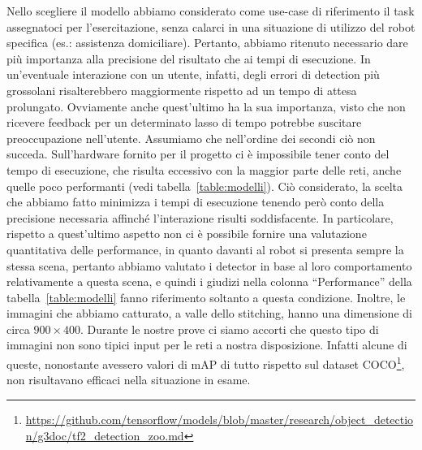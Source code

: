 Nello scegliere il modello abbiamo considerato come use-case di riferimento il task assegnatoci per l'esercitazione, senza calarci in una situazione di utilizzo del robot specifica (es.\@: assistenza domiciliare). Pertanto, abbiamo ritenuto necessario dare più importanza alla precisione del risultato che ai tempi di esecuzione. In un'eventuale interazione con un utente, infatti, degli errori di detection più grossolani risalterebbero maggiormente rispetto ad un tempo di attesa prolungato. Ovviamente anche quest'ultimo ha la sua importanza, visto che non ricevere feedback per un determinato lasso di tempo potrebbe suscitare preoccupazione nell'utente. Assumiamo che nell'ordine dei secondi ciò non succeda. 
Sull'hardware fornito per il progetto ci è impossibile tener conto del tempo di esecuzione, che risulta eccessivo con la maggior parte delle reti, anche quelle poco performanti (vedi tabella~\ref{table:modelli}). Ciò considerato, la scelta che abbiamo fatto minimizza i tempi di esecuzione tenendo però conto della precisione necessaria affinché l'interazione risulti soddisfacente.
In particolare, rispetto a quest’ultimo aspetto non ci è possibile fornire una valutazione quantitativa delle performance, in quanto davanti al robot si presenta sempre la stessa scena, pertanto abbiamo valutato i detector in base al loro comportamento relativamente a questa scena, e quindi i giudizi nella colonna “Performance” della tabella~\ref{table:modelli} fanno riferimento soltanto a questa condizione. Inoltre, le immagini che abbiamo catturato, a valle dello stitching, hanno una dimensione di circa $900 \times 400$. Durante le nostre prove ci siamo accorti che questo tipo di immagini non sono tipici input per le reti a nostra disposizione. Infatti alcune di queste, nonostante avessero valori di mAP di tutto rispetto sul dataset COCO\footnote{\url{https://github.com/tensorflow/models/blob/master/research/object_detection/g3doc/tf2_detection_zoo.md}}, non risultavano efficaci nella situazione in esame.

